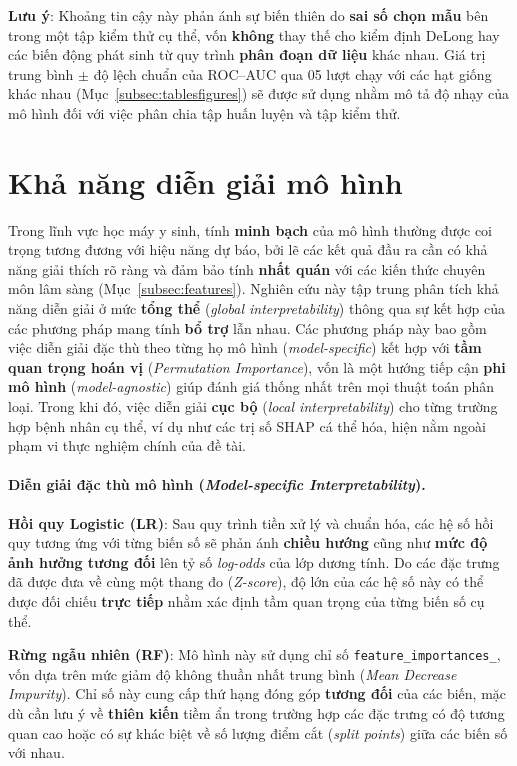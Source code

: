 \documentclass[14pt,a4paper]{extreport}
\begin{document}
\textbf{Lưu ý}: Khoảng tin cậy này phản ánh sự biến thiên do \textbf{sai số chọn mẫu} bên trong một tập kiểm thử cụ thể, vốn \textbf{không} thay thế cho kiểm định DeLong hay các biến động phát sinh từ quy trình \textbf{phân đoạn dữ liệu} khác nhau. Giá trị trung bình $\pm$ độ lệch chuẩn của ROC--AUC qua 05 lượt chạy với các hạt giống khác nhau (Mục~\ref{subsec:tablesfigures}) sẽ được sử dụng nhằm mô tả độ nhạy của mô hình đối với việc phân chia tập huấn luyện và tập kiểm thử.

\section{Khả năng diễn giải mô hình}
\label{subsec:interpret}

Trong lĩnh vực học máy y sinh, tính \textbf{minh bạch} của mô hình thường được coi trọng tương đương với hiệu năng dự báo, bởi lẽ các kết quả đầu ra cần có khả năng giải thích rõ ràng và đảm bảo tính \textbf{nhất quán} với các kiến thức chuyên môn lâm sàng (Mục~\ref{subsec:features}). Nghiên cứu này tập trung phân tích khả năng diễn giải ở mức \textbf{tổng thể} (\textit{global interpretability}) thông qua sự kết hợp của các phương pháp mang tính \textbf{bổ trợ} lẫn nhau. Các phương pháp này bao gồm việc diễn giải đặc thù theo từng họ mô hình (\textit{model-specific}) kết hợp với \textbf{tầm quan trọng hoán vị} (\textit{Permutation Importance}), vốn là một hướng tiếp cận \textbf{phi mô hình} (\textit{model-agnostic}) giúp đánh giá thống nhất trên mọi thuật toán phân loại. Trong khi đó, việc diễn giải \textbf{cục bộ} (\textit{local interpretability}) cho từng trường hợp bệnh nhân cụ thể, ví dụ như các trị số SHAP cá thể hóa, hiện nằm ngoài phạm vi thực nghiệm chính của đề tài.

\paragraph{Diễn giải đặc thù mô hình (\textit{Model-specific Interpretability}).}

\textbf{Hồi quy Logistic (LR)}: Sau quy trình tiền xử lý và chuẩn hóa, các hệ số hồi quy tương ứng với từng biến số sẽ phản ánh \textbf{chiều hướng} cũng như \textbf{mức độ ảnh hưởng tương đối} lên tỷ số \textit{log-odds} của lớp dương tính. Do các đặc trưng đã được đưa về cùng một thang đo (\textit{Z-score}), độ lớn của các hệ số này có thể được đối chiếu \textbf{trực tiếp} nhằm xác định tầm quan trọng của từng biến số cụ thể.

\textbf{Rừng ngẫu nhiên (RF)}: Mô hình này sử dụng chỉ số \texttt{feature\_importances\_}, vốn dựa trên mức giảm độ không thuần nhất trung bình (\textit{Mean Decrease Impurity}). Chỉ số này cung cấp thứ hạng đóng góp \textbf{tương đối} của các biến, mặc dù cần lưu ý về \textbf{thiên kiến} tiềm ẩn trong trường hợp các đặc trưng có độ tương quan cao hoặc có sự khác biệt về số lượng điểm cắt (\textit{split points}) giữa các biến số với nhau.
\end{document}
